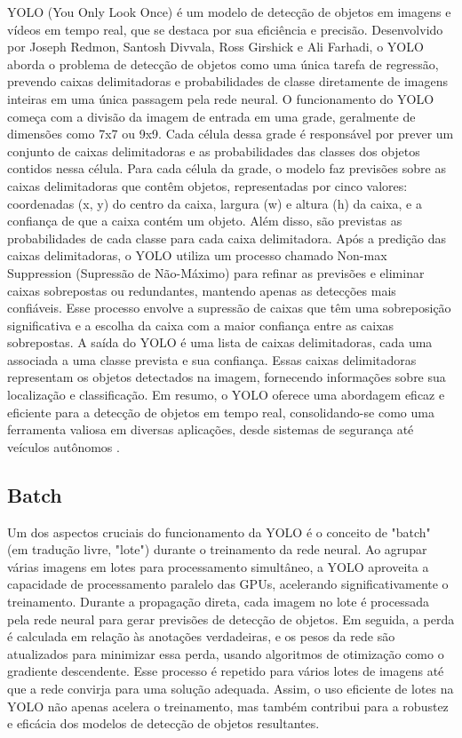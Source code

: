 YOLO (You Only Look Once) é um modelo de detecção de objetos em imagens e vídeos em tempo real, que se destaca por sua eficiência e precisão. Desenvolvido por Joseph Redmon, Santosh Divvala, Ross Girshick e Ali Farhadi, o YOLO aborda o problema de detecção de objetos como uma única tarefa de regressão, prevendo caixas delimitadoras e probabilidades de classe diretamente de imagens inteiras em uma única passagem pela rede neural. O funcionamento do YOLO começa com a divisão da imagem de entrada em uma grade, geralmente de dimensões como 7x7 ou 9x9. Cada célula dessa grade é responsável por prever um conjunto de caixas delimitadoras e as probabilidades das classes dos objetos contidos nessa célula. Para cada célula da grade, o modelo faz previsões sobre as caixas delimitadoras que contêm objetos, representadas por cinco valores: coordenadas (x, y) do centro da caixa, largura (w) e altura (h) da caixa, e a confiança de que a caixa contém um objeto. Além disso, são previstas as probabilidades de cada classe para cada caixa delimitadora. Após a predição das caixas delimitadoras, o YOLO utiliza um processo chamado Non-max Suppression (Supressão de Não-Máximo) para refinar as previsões e eliminar caixas sobrepostas ou redundantes, mantendo apenas as detecções mais confiáveis. Esse processo envolve a supressão de caixas que têm uma sobreposição significativa e a escolha da caixa com a maior confiança entre as caixas sobrepostas. A saída do YOLO é uma lista de caixas delimitadoras, cada uma associada a uma classe prevista e sua confiança. Essas caixas delimitadoras representam os objetos detectados na imagem, fornecendo informações sobre sua localização e classificação. Em resumo, o YOLO oferece uma abordagem eficaz e eficiente para a detecção de objetos em tempo real, consolidando-se como uma ferramenta valiosa em diversas aplicações, desde sistemas de segurança até veículos autônomos \cite{redmon2016youlookonce}.


\subsection{Batch}
\label{sec:batch}

Um dos aspectos cruciais do funcionamento da YOLO é o conceito de "batch" (em tradução livre, "lote") durante o treinamento da rede neural. Ao agrupar várias imagens em lotes para processamento simultâneo, a YOLO aproveita a capacidade de processamento paralelo das GPUs, acelerando significativamente o treinamento. Durante a propagação direta, cada imagem no lote é processada pela rede neural para gerar previsões de detecção de objetos. Em seguida, a perda é calculada em relação às anotações verdadeiras, e os pesos da rede são atualizados para minimizar essa perda, usando algoritmos de otimização como o gradiente descendente. Esse processo é repetido para vários lotes de imagens até que a rede convirja para uma solução adequada. Assim, o uso eficiente de lotes na YOLO não apenas acelera o treinamento, mas também contribui para a robustez e eficácia dos modelos de detecção de objetos resultantes. \cite{goodfellow2016deep}

